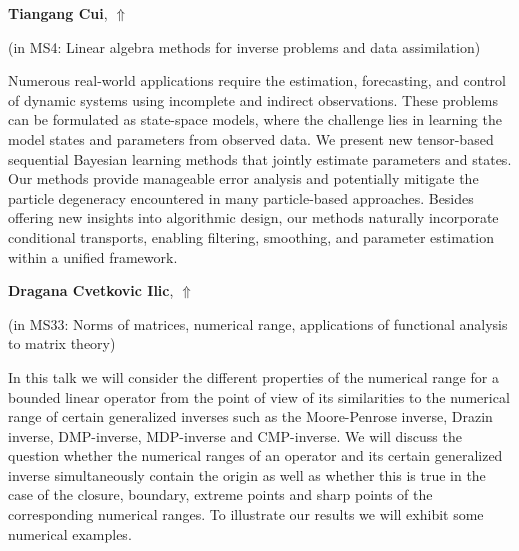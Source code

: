 \documentclass[ILAS2025-program.tex]{subfiles}
\begin{document}
\hypertarget{down0204}{}\begin{ilasabstract}
    
\textbf{Tiangang Cui},  \hfill \hyperlink{up0204}{$\Uparrow$}
    
    
(in {\color{mstitle}MS4: Linear algebra methods for inverse problems and data assimilation})
        
\mtskip
    Numerous real-world applications require the estimation, forecasting, and control of dynamic systems using incomplete and indirect observations. These problems can be formulated as state-space models, where the challenge lies in learning the model states and parameters from observed data. We present new tensor-based sequential Bayesian learning methods that jointly estimate parameters and states. Our methods provide manageable error analysis and potentially mitigate the particle degeneracy encountered in many particle-based approaches. Besides offering new insights into algorithmic design, our methods naturally incorporate conditional transports, enabling filtering, smoothing, and parameter estimation within a unified framework.

\end{ilasabstract}
    

\hypertarget{down0245}{}\begin{ilasabstract}
    
\textbf{Dragana Cvetkovic Ilic},  \hfill \hyperlink{up0245}{$\Uparrow$}
    
    
(in {\color{mstitle}MS33: Norms of matrices, numerical range, applications of functional analysis to matrix theory})
        
\mtskip
    In this talk we will consider the different properties of the numerical range for a bounded linear operator from the point of view of its similarities  to the numerical range  of certain generalized inverses such as the Moore-Penrose inverse, Drazin inverse, DMP-inverse, MDP-inverse and CMP-inverse.  We will discuss  the question whether the numerical ranges of an operator and its certain generalized inverse simultaneously contain the origin as well as whether this is true in the case of the closure, boundary, extreme points and sharp points of the corresponding numerical ranges.  To illustrate our results we will exhibit some numerical examples.
\end{ilasabstract}
    
\end{document}
